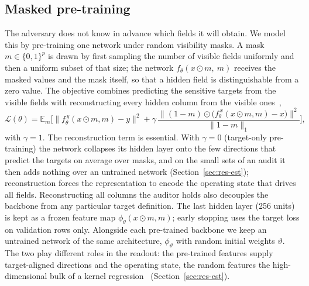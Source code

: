 \subsection{Masked pre-training}
The adversary does not know in advance which fields it will obtain. We model this by
pre-training one network under random visibility masks. A mask $m\in\{0,1\}^{p}$ is drawn by
first sampling the number of visible fields uniformly and then a uniform subset of that size;
the network $f_\theta(x\odot m,\ m)$ receives the masked values and the mask itself, so that a
hidden field is distinguishable from a zero value. The objective combines predicting the sensitive targets from the visible fields with reconstructing every hidden column
from the visible ones~\cite{yoon2020vime,he2022mae},
\begin{equation}\label{eq:pretrain}
\mathcal L(\theta)=\mathbb{E}_{m}\Big[\big\|f^{\,y}_\theta(x\odot m,m)-y\big\|^2
+\gamma\,\frac{\big\|(1-m)\odot\big(f^{\,x}_\theta(x\odot m,m)-x\big)\big\|^2}{\|1-m\|_1}\Big],
\end{equation}
with $\gamma=1$. The reconstruction term is essential. With $\gamma=0$ (target-only pre-training) the network collapses its
hidden layer onto the few directions that predict the targets on average over masks, and on the small sets of an audit it
then adds nothing over an untrained network (Section~\ref{sec:res-est}); reconstruction forces the representation to encode
the operating state that drives all fields. Reconstructing all columns the auditor holds also decouples the backbone from
any particular target definition. The last hidden layer (256 units) is kept as a frozen feature map
$\phi_\theta(x\odot m, m)$; early stopping uses the target loss on validation rows only. Alongside each pre-trained backbone
we keep an untrained network of the same architecture, $\phi_{\vartheta}$ with random initial weights $\vartheta$. The two
play different roles in the readout: the pre-trained features supply target-aligned directions and the operating state, the
random features the high-dimensional bulk of a kernel regression~\cite{rahimi2007random} (Section~\ref{sec:res-est}).

